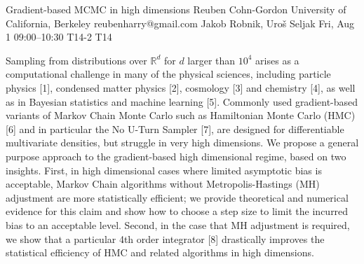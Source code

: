 \begin{talk}
  {Gradient-based MCMC in high dimensions}%
  {Reuben Cohn-Gordon}%
  {University of California, Berkeley}%
  {reubenharry@gmail.com}%
  {Jakob Robnik, Uroš Seljak}%
  {}%
  {Fri, Aug 1 09:00–10:30}%
  {T14-2}%
  {T14}%
  
				
			
Sampling from distributions over $\mathbb{R}^d$ for $d$ larger than $10^4$ arises as a computational challenge in many of the physical sciences, including particle physics [1], condensed matter physics [2], cosmology [3] and chemistry [4], as well as in Bayesian statistics and machine learning [5]. Commonly used gradient-based variants of Markov Chain Monte Carlo such as Hamiltonian Monte Carlo (HMC) [6] and in particular the No U-Turn Sampler [7], are designed for differentiable multivariate densities, but struggle in very high dimensions. 
We propose a general purpose approach to the gradient-based high dimensional regime, based on two insights. First, in high dimensional cases where limited asymptotic bias is acceptable, Markov Chain algorithms without Metropolis-Hastings (MH) adjustment are more statistically efficient; we provide theoretical and numerical evidence for this claim and show how to choose a step size to limit the incurred bias to an acceptable level. Second, in the case that MH adjustment is required, we show that a particular 4th order integrator [8] drastically improves the statistical efficiency of HMC and related algorithms in high dimensions.


\medskip


\end{talk}
